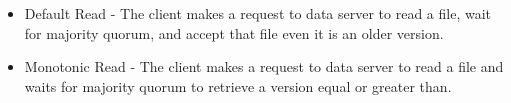 \begin{itemize}
\item Default Read - The client makes a request to data server to read
a file, wait for majority quorum, and accept that file even it is an
older version.

\item Monotonic Read - The client makes a request to data server to read
a file and waits for majority quorum to retrieve a version equal or
greater than.
\end{itemize}
